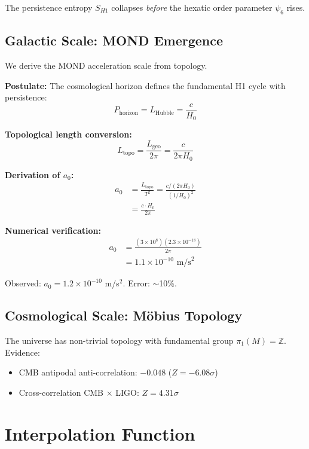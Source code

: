 \documentclass[aps,pre,twocolumn,superscriptaddress]{revtex4-2}
\begin{document}
The persistence entropy $S_{H1}$ collapses \textit{before} the hexatic order parameter $\psi_6$ rises.

\subsection{Galactic Scale: MOND Emergence}

We derive the MOND acceleration scale from topology.

\textbf{Postulate:} The cosmological horizon defines the fundamental H1 cycle with persistence:
\begin{equation}
P_{\text{horizon}} = L_{\text{Hubble}} = \frac{c}{H_0}
\end{equation}

\textbf{Topological length conversion:}
\begin{equation}
L_{\text{topo}} = \frac{L_{\text{geo}}}{2\pi} = \frac{c}{2\pi H_0}
\end{equation}

\textbf{Derivation of $a_0$:}
\begin{align}
a_0 &= \frac{L_{\text{topo}}}{T^2} = \frac{c/(2\pi H_0)}{(1/H_0)^2} \\
&= \frac{c \cdot H_0}{2\pi}
\end{align}

\textbf{Numerical verification:}
\begin{align}
a_0 &= \frac{(3 \times 10^8)(2.3 \times 10^{-18})}{2\pi} \\
&= 1.1 \times 10^{-10} \text{ m/s}^2
\end{align}

Observed: $a_0 = 1.2 \times 10^{-10}$ m/s$^2$. Error: $\sim$10\%.

\subsection{Cosmological Scale: M\"obius Topology}

The universe has non-trivial topology with fundamental group $\pi_1(M) = \mathbb{Z}$. Evidence:
\begin{itemize}
\item CMB antipodal anti-correlation: $-0.048$ ($Z = -6.08\sigma$)
\item Cross-correlation CMB $\times$ LIGO: $Z = 4.31\sigma$
\end{itemize}

\section{Interpolation Function}
\end{document}
